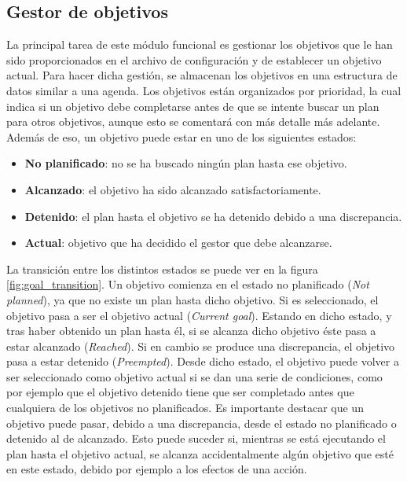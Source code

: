 \subsection{Gestor de objetivos}

La principal tarea de este módulo funcional es gestionar los objetivos que le han sido proporcionados
en el archivo de configuración y de establecer un objetivo actual. Para hacer dicha gestión, se almacenan
los objetivos en una estructura de datos similar a una agenda. Los objetivos están organizados
por prioridad, la cual indica si un objetivo debe completarse antes de que se intente buscar un plan
para otros objetivos, aunque esto se comentará con más detalle más adelante. Además de eso, un objetivo
puede estar en uno de los siguientes estados:

\begin{itemize}[label=\textbullet]
    \item \textbf{No planificado}: no se ha buscado ningún plan hasta ese objetivo.
    \item \textbf{Alcanzado}: el objetivo ha sido alcanzado satisfactoriamente.
    \item \textbf{Detenido}: el plan hasta el objetivo se ha detenido debido a una discrepancia.
    \item \textbf{Actual}: objetivo que ha decidido el gestor que debe alcanzarse.
\end{itemize}

La transición entre los distintos estados se puede ver en la figura \ref{fig:goal_transition}.
Un objetivo comienza en el estado no planificado (\textit{Not planned}), ya que no existe un plan
hasta dicho objetivo. Si es seleccionado, el objetivo pasa a ser el objetivo actual (\textit{Current goal}).
Estando en dicho estado, y tras haber obtenido un plan hasta él, si se alcanza dicho objetivo éste
pasa a estar alcanzado (\textit{Reached}). Si en cambio se produce una discrepancia, el objetivo pasa
a estar detenido (\textit{Preempted}). Desde dicho estado, el objetivo puede volver a ser
seleccionado como objetivo actual si se dan una serie de condiciones, como por ejemplo que
el objetivo detenido tiene que ser completado antes que cualquiera de los objetivos no planificados.
Es importante destacar que un objetivo puede pasar, debido a una discrepancia, desde el estado
no planificado o detenido al de alcanzado. Esto puede suceder si, mientras se está ejecutando el plan
hasta el objetivo actual, se alcanza accidentalmente algún objetivo que esté en este estado, debido
por ejemplo a los efectos de una acción.

